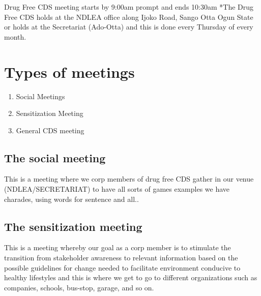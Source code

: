 \documentclass{report}
\begin{document}
Drug Free CDS meeting starts by 9:00am prompt and ends 10:30am
*The Drug Free CDS holds at the NDLEA office along Ijoko Road, Sango Otta Ogun State or holds at the Secretariat (Ado-Otta) and this is done every Thursday of every month.

\section{Types of meetings}
\begin{enumerate}
    \item Social Meetings 
    
    \item Sensitization Meeting
    
    \item General CDS meeting
\end{enumerate}

\subsection{The social meeting}
This is a meeting where we corp members of drug free CDS gather in our venue (NDLEA/SECRETARIAT) to have all sorts of games examples we have charades, using words for sentence and all..

\subsection{The sensitization meeting}
This is a meeting whereby our goal as a corp member is to stimulate the transition from stakeholder awareness to relevant information based on the possible guidelines for change needed to facilitate environment conducive to healthy lifestyles and this is where we get to go to different organizations such as companies, schools, bus-stop, garage, and so on.
\end{document}
